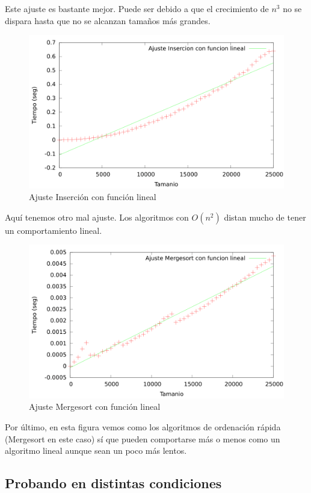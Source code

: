 \documentclass{article}
\begin{document}
	Este ajuste es bastante mejor. Puede ser debido a que el crecimiento de $n^3$ no se dispara hasta que no se alcanzan tamaños más grandes. 
	\begin{figure}[H]
		\centering
		\includegraphics[totalheight=8cm]{img/ajusteInsercion_lineal}
		\caption{Ajuste Inserción con función lineal}
		\label{fig:ajusteInsercion_lineal}
	\end{figure}
	Aquí tenemos otro mal ajuste. Los algoritmos con $O(n^2)$ distan mucho de tener un comportamiento lineal.
	\begin{figure}[H]
		\centering
		\includegraphics[totalheight=8cm]{img/ajusteMergesort_lineal}
		\caption{Ajuste Mergesort con función lineal}
		\label{fig:ajusteMergesort_lineal}
	\end{figure}
	
	Por último, en esta figura vemos como los algoritmos de ordenación rápida (Mergesort en este caso) sí que pueden comportarse más o menos como un algoritmo lineal aunque sean un poco más lentos.

\subsection{Probando en distintas condiciones}
\end{document}
